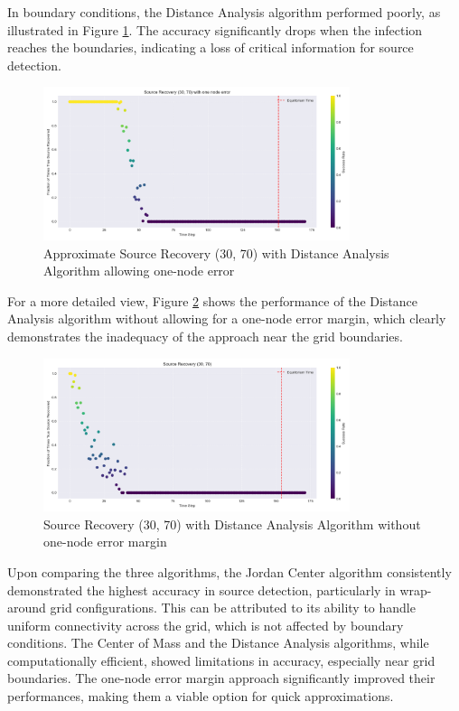 In boundary conditions, the Distance Analysis algorithm performed poorly, as illustrated in Figure \ref{fig:Approx_Source_Recovery_30_70_Distance_Analysis}. The accuracy significantly drops when the infection reaches the boundaries, indicating a loss of critical information for source detection.

\begin{figure}[H]
    \centering
    \includegraphics[width=0.8\textwidth]{Approx_Source_Recovery_30_70_Distance_Analysis.png}
    \caption{Approximate Source Recovery (30, 70) with Distance Analysis Algorithm allowing one-node error}
    \label{fig:Approx_Source_Recovery_30_70_Distance_Analysis}
\end{figure}

For a more detailed view, Figure \ref{fig:source_recovery_30_70_Distance_Analysis} shows the performance of the Distance Analysis algorithm without allowing for a one-node error margin, which clearly demonstrates the inadequacy of the approach near the grid boundaries.

\begin{figure}[H]
    \centering
    \includegraphics[width=0.8\textwidth]{Source_Recovery_30_70_Distance_Analysis.png}
    \caption{Source Recovery (30, 70) with Distance Analysis Algorithm without one-node error margin}
    \label{fig:source_recovery_30_70_Distance_Analysis}
\end{figure}

Upon comparing the three algorithms, the Jordan Center algorithm consistently demonstrated the highest accuracy in source detection, particularly in wrap-around grid configurations. This can be attributed to its ability to handle uniform connectivity across the grid, which is not affected by boundary conditions. The Center of Mass and the Distance Analysis algorithms, while computationally efficient, showed limitations in accuracy, especially near grid boundaries. The one-node error margin approach significantly improved their performances, making them a viable option for quick approximations.\\

